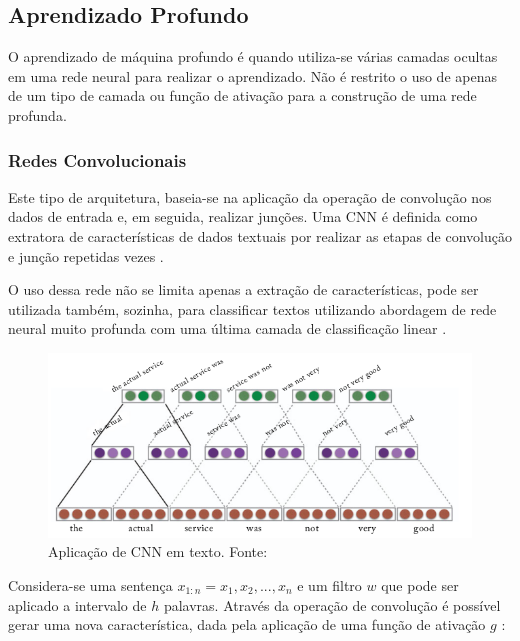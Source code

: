 \subsection{Aprendizado Profundo}

O aprendizado de máquina profundo é quando utiliza-se várias camadas ocultas em uma rede neural para realizar o aprendizado. Não é restrito o uso de apenas de um tipo de camada ou função de ativação para a construção de uma rede profunda.

\subsubsection{Redes Convolucionais}

Este tipo de arquitetura, baseia-se na aplicação da operação de convolução nos dados de entrada e, em seguida, realizar junções. Uma CNN é definida como extratora de características de dados textuais por realizar as etapas de convolução e junção repetidas vezes \cite{GOLDBERG2017}. 

O uso dessa rede não se limita apenas a extração de características, pode ser utilizada também, sozinha, para classificar textos utilizando abordagem de rede neural muito profunda com uma última camada de classificação linear \cite{CONNEAU2016}.

\begin{figure}[h]
	\centering
	\includegraphics[keepaspectratio=true,scale=0.5]{figuras/cnnText}
	\caption[Aplicação de CNN em texto]{Aplicação de CNN em texto. Fonte: \cite[Página 160]{GOLDBERG2017}}
	\label{fig:filterCnnText}
\end{figure}

Considera-se uma sentença $x_{1:n} = x_{1}, x_{2}, ..., x_{n}$ e um filtro $w$ que pode ser aplicado a intervalo de $h$ palavras. Através da operação de convolução é possível gerar uma nova característica, dada pela aplicação de uma função de ativação $g$ \cite{KIM2014}:

